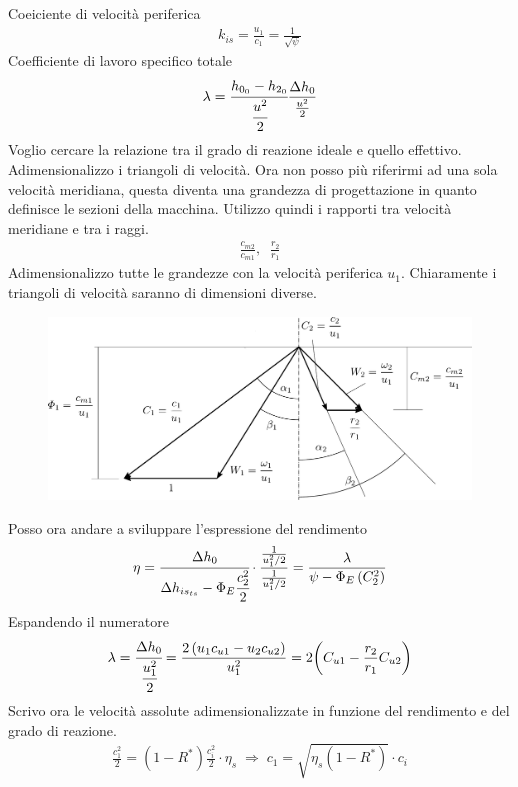 Coeiciente di velocità periferica
\begin{align*}
k_{is} = \frac{u_1}{c_1} = \frac{1}{\sqrt{\psi}}
\end{align*}
Coefficiente di lavoro specifico totale
\begin{align*}
\lambda = \cfrac{h_{0_0} - h_{2_0}}{\cfrac{u^2}{2}} \frac{\Delta h_0}{\frac{u^2}{2}}
\end{align*}
Voglio cercare la relazione tra il grado di reazione ideale e quello effettivo. Adimensionalizzo i triangoli di velocità. Ora non posso più riferirmi ad una sola velocità meridiana, questa diventa una grandezza di progettazione in quanto definisce le sezioni della macchina. Utilizzo quindi i rapporti tra velocità meridiane e tra i raggi.
\begin{align*}
\frac{c_{m2}}{c_{m1}}, \;\; \frac{r_2}{r_1}
\end{align*}
Adimensionalizzo tutte le grandezze con la velocità periferica $u_1$. Chiaramente i triangoli di velocità saranno di dimensioni diverse. 
\begin{figure}[h!]
\centering
  \includegraphics[width=.8\textwidth]{fig/triangTurb.pdf}
\caption{}
\label{fig:triangTurb}
\end{figure}
Posso ora andare a sviluppare l'espressione del rendimento
\begin{equation}
\eta = \cfrac{\Delta h_0}{\Delta h_{is_{ts}} - \Phi_E \cfrac{c_2^2}{2}} \cdot \frac{\frac{1}{u_1^2/2}}{\frac{1}{u_1^2/2}} = \frac{\lambda}{\psi - \Phi_E \left( C_2^2 \right)}
\end{equation}
Espandendo il numeratore
\begin{align*}
\lambda = \cfrac{\Delta h_0}{\cfrac{u_1^2}{2}} = \frac{2 \left( u_1 c_{u1} - u_2 c_{u2} \right)}{u_1^2} = 2 \bigg( C_{u1} - \frac{r_2}{r_1} C_{u2} \bigg)
\end{align*}
Scrivo ora le velocità assolute adimensionalizzate in funzione del rendimento e del grado di reazione. 
\begin{align*}
\frac{c_1^2}{2} = \left( 1 - R^* \right) \frac{c_i^2}{2} \cdot \eta_s \; \Rightarrow \; c_1 = \sqrt{\eta_s \left( 1 - R^* \right)} \cdot c_i
\end{align*}
